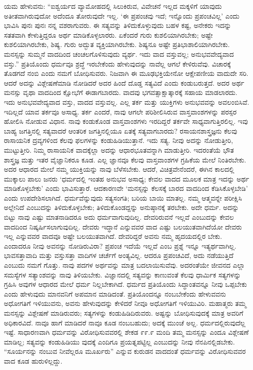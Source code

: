 ಯಮ ಹೇಳುವನು: “ಐಶ್ವರ್ಯದ ವ್ಯಾಮೋಹದಲ್ಲಿ ಸಿಲುಕಿರುವ, ವಿವೇಚನೆ ಇಲ್ಲದ ಮಕ್ಕಳಿಗೆ ಯಾವುದು ಅತೀತವಾಗಿರುವುದೋ ಅದೆಂದೂ ತೋರುವುದೇ ಇಲ್ಲ. ‘ಈ ಪ್ರಪಂಚವು ಇದೆ; ಇನ್ನೊಂದು ಪ್ರಪಂಚವಿಲ್ಲ’ ಎಂದು ಭಾವಿಸಿ ಪುನಃ ಪುನಃ ನನ್ನ ವಶರಾಗುವರು. ಈ ಸತ್ಯವನ್ನು ತಿಳಿದುಕೊಳ್ಳುವುದು ಬಹಳ ಕಷ್ಟ, ಅನೇಕರು ಇದನ್ನು ಸತತವಾಗಿ ಕೇಳುತ್ತಿದ್ದರೂ ಅರ್ಥ ಮಾಡಿಕೊಳ್ಳಲಾರರು. ಏಕೆಂದರೆ ಗುರು ಕುಶಲಿಯಾಗಿರಬೇಕು; ಅಷ್ಟೇ ಕುಶಲಿಯಾಗಿರಬೇಕು, ಶಿಷ್ಯ. ಗುರು ಅದ್ಭುತ ವ್ಯಕ್ತಿಯಾಗಿರಬೇಕು. ಶಿಷ್ಯನೂ ಅಷ್ಟೇ ಪ್ರತಿಭಾಶಾಲಿಯಾಗಿರಬೇಕು. ಮನಸ್ಸನ್ನು ಸುಮ್ಮನೆ ವಾದದಿಂದ ಚಂಚಲಗೊಳಿಸುವುದು ವ್ಯರ್ಥ. ಇದು ವಾದ ವಸ್ತುವಲ್ಲ; ಅನುಭವವೇದ್ಯವಾದ ವಸ್ತು.” ಪ್ರತಿಯೊಂದು ಧರ್ಮವೂ ಶ್ರದ್ಧೆ ಇರಬೇಕೆಂದು ಹೇಳುವುದನ್ನು ನಾವೆಲ್ಲ ಆಗಲೆ ಕೇಳಿರುವೆವು. ವಿಚಾರಕ್ಕೆ ತೊಡಗದೆ ನಂಬಿ ಎಂದು ನಮಗೆ ಬೋಧಿಸುವರು. ನಿಜವಾಗಿ ಈ ಮೂಢಭಕ್ತಿಯೇನೋ ಆಕ್ಷೇಪಣೀಯ ವಾದುದೇ ಸರಿ. ಆದರೆ ಅದನ್ನು ವಿಶ್ಲೇಷಣೆಮಾಡಿ ನೋಡಿದರೆ ಅದರ ಹಿಂದೆ ದೊಡ್ಡ ಸತ್ಯವಿದೆ ಎಂದು ಕಂಡುಬರುತ್ತದೆ. ಅದರ ಅರ್ಥ ಮನಸ್ಸು ವೃಥಾ ವಾದದಿಂದ ಕ್ಷೋಭೆಗೆ ಈಡಾಗಬಾರದು. ವಾದವು ಭಗವತ್ಸಾಕ್ಷಾತ್ಕಾರಕ್ಕೆ ಸಹಾಯ ಮಾಡಲಾರದು. ಇದು ಅನುಭವವೇದ್ಯವಾದ ವಸ್ತು, ವಾದದ ವಸ್ತುವಲ್ಲ. ಎಲ್ಲ ತರ್ಕ ಮತ್ತು ಯುಕ್ತಿಗಳು ಅನುಭವವನ್ನು ಅವಲಂಬಿಸಿವೆ. ಇದಿಲ್ಲದೆ ಯಾವ ತರ್ಕವೂ ಅಸಾಧ್ಯ. ತರ್ಕ ಎಂದರೆ, ನಾವು ಆಗಲೇ ಪರಿಶೀಲಿಸಿರುವ ವಾಸ್ತವಾಂಶಗಳನ್ನು ಪರಸ್ಪರ ಹೋಲಿಸಿ ನೋಡುವ ವಿಧಾನ. ನಾವು ಕಂಡುಕೊಂಡ ವಾಸ್ತವಾಂಶಗಳು ಇರದಿದ್ದರೆ ತರ್ಕವೇ ಸಾಧ್ಯವಾಗುತ್ತಿರಲಿಲ್ಲ. ಇವು ಬಾಹ್ಯ ಜಗತ್ತಿನಲ್ಲಿ ಸತ್ಯವಾದರೆ ಆಂತರಿಕ ಜಗತ್ತಿನಲ್ಲಿಯೂ ಏತಕ್ಕೆ ಸತ್ಯವಾಗಬಾರದು? ರಸಾಯನಶಾಸ್ತ್ರಜ್ಞನು ಕೆಲವು ರಾಸಾಯನಿಕ ದ್ರವ್ಯಗಳಿಂದ ಕೆಲವು ಫಲಗಳನ್ನು ಕಂಡುಹಿಡಿಯುತ್ತಾನೆ. ಇದು ಸತ್ಯ. ನೀವು ಅದನ್ನು ನೋಡುತ್ತೀರಿ, ಮುಟ್ಟುತ್ತೀರಿ. ನಿಮ್ಮ ರಾಸಾಯನಿಕ ವಾದಕ್ಕೆಲ್ಲಾ ಅದನ್ನು ಆಧಾರಭೂತವನ್ನಾಗಿ ಮಾಡುತ್ತೀರಿ. ಇದರಂತೆಯೆ ಭೌತ ಶಾಸ್ತ್ರಜ್ಞ ಮತ್ತು ಇತರ ವೈಜ್ಞಾನಿಕರೂ ಕೂಡ. ಎಲ್ಲ ಜ್ಞಾನವೂ ಕೆಲವು ವಾಸ್ತವಾಂಶಗಳ ಗ್ರಹಿಕೆಯ ಮೇಲೆ ನಿಂತಿರಬೇಕು. ಅದರ ಆಧಾರದ ಮೇಲೆ ನಮ್ಮ ಯುಕ್ತಿಯನ್ನು ನಾವು ಬೆಳೆಸಬೇಕು. ಆದರೆ, ವಿಚಿತ್ರವೇನೆಂದರೆ, ಈಗಿನ ಕಾಲದಲ್ಲಿ ಮುಕ್ಕಾಲು ಪಾಲು ಜನರು ‘ಧರ್ಮದಲ್ಲಿ ಇಂತಹ ಅನುಭವ ಅಸಾಧ್ಯ; ಕೇವಲ ವಾದದ ಮೂಲಕ ಮಾತ್ರ ಇದನ್ನು ಅರ್ಥ ಮಾಡಿಕೊಳ್ಳಬೇಕು’ ಎಂದು ಭಾವಿಸುತ್ತಾರೆ. ಆದಕಾರಣವೇ ‘ಮನಸ್ಸನ್ನು ಕೆಲಸಕ್ಕೆ ಬಾರದ ವಾದದಿಂದ ಕೆಡಿಸಿಕೊಳ್ಳಬೇಡಿ’ ಎಂದು ಉಪದೇಶಿಸಲಾಗಿದೆ. ಧರ್ಮವೆನ್ನುವುದು ಸತ್ಯಸಂಗತಿ; ಬರಿಯ ಬಾಯಿ ಮಾತಲ್ಲ. ನಮ್ಮ ಆತ್ಮವನ್ನೇ ಪರೀಕ್ಷಿಸಿ ಅಲ್ಲೇನಿದೆ ಎಂಬುದನ್ನು ತಿಳಿದುಕೊಳ್ಳಬೇಕು; ತಿಳಿದುಕೊಂಡದ್ದನ್ನು ಅನುಷ್ಠಾನಕ್ಕೆ ತರಬೇಕು. ಅದೇ ಧರ್ಮ. ಅದನ್ನು ಬಿಟ್ಟು ನಾವು ಎಷ್ಟು ಮಾತನಾಡಿದರೂ ಅದು ಧರ್ಮವಾಗುವುದಿಲ್ಲ. ದೇವರಿರುವನೆ ಇಲ್ಲವೆ ಎಂಬುದನ್ನು ಕೇವಲ ವಾದದಿಂದ ನಿಷ್ಕರ್ಷಿಸಲಾಗುವುದಿಲ್ಲ. ದೇವರು ಇದ್ಧಾನೆ ಎನ್ನುವವರ ವಾದ ಎಷ್ಟು ಬಲಯುತವಾಗಿದೆಯೋ ದೇವರು ಇಲ್ಲ ಎನ್ನುವವರ ವಾದವೂ ಅಷ್ಟೇ ಬಲಯುತವಾಗಿದೆ. ದೇವರಿದ್ದರೆ ಅವನು ನಮ್ಮ ಹೃದಯದಲ್ಲಿರ ಬೇಕು. ಎಂದಾದರೂ ನೀವು ಅವನನ್ನು ನೋಡಿರುವಿರಾ? ಪ್ರಪಂಚ ಇದೆಯೆ ಇಲ್ಲವೆ ಎಂಬ ಪ್ರಶ್ನೆ ಇನ್ನೂ ಇತ್ಯರ್ಥವಾಗಿಲ್ಲ. ಭಾವಸತ್ತಾವಾದಿ ಮತ್ತು ವಸ್ತುಸತ್ತಾ ವಾದಿಗಳ ಚರ್ಚೆಗೆ ಅಂತ್ಯವಿಲ್ಲ. ಆದರೂ ಪ್ರಪಂಚವಿದೆ, ಅದು ನಡೆಯುತ್ತಿದೆ ಎಂಬುದು ನಮಗೆ ಗೊತ್ತು. ನಾವು ಪದಗಳ ಅರ್ಥವನ್ನು ಮಾತ್ರ ಬದಲಾಯಿಸುವೆವು. ಅದರಂತೆಯೇ ಜೀವನದ ಎಲ್ಲಾ ಸಮಸ್ಯೆಗಳ ಸತ್ಯಾಂಶವನ್ನು ನಾವು ತಿಳಿಯಬೇಕು. ವಿಜ್ಞಾನದಲ್ಲಿ ಸತ್ಯವನ್ನು ಕಾಣುವಂತೆ ಕೆಲವು ಧಾರ್ಮಿಕ ಸತ್ಯಗಳನ್ನು ಗ್ರಹಿಸಿ ಅವುಗಳ ಆಧಾರದ ಮೇಲೆ ಧರ್ಮ ನಿಲ್ಲಬೇಕಾಗಿದೆ. ಧರ್ಮದ ಪ್ರತಿಯೊಂದು ಸಿದ್ಧಾಂತವನ್ನೂ ನೀವು ಒಪ್ಪಬೇಕು ಎಂದು ಹೇಳುವುದು ಮಾನವನಿಗೆ ಅಪಮಾನ ಮಾಡಿದಂತೆ. ಪ್ರತಿಯೊಂದನ್ನೂ ನಂಬಬೇಕೆಂದು ಹೇಳುವವನು ಅಧೋಗತಿಗೆ ಇಳಿಯುವನು, ಅವನು ಹೇಳುವುದನ್ನು ಕೇಳಿದರೆ ನೀವೂ ಅಧೋಗತಿಗೆ ಇಳಿಯುವಿರಿ. ಮಹಾತ್ಮರು ತಮ್ಮ ಮನಸ್ಸನ್ನು ವಿಶ್ಲೇಷಣೆ ಮಾಡಿರುವರು; ಸತ್ಯಗಳನ್ನು ಕಂಡುಹಿಡಿದಿರುವರು. ಅಷ್ಟನ್ನು ಬೋಧಿಸುವುದಕ್ಕೆ ಮಾತ್ರ ಅವರಿಗೆ ಅಧಿಕಾರವಿದೆ. ನಾವೂ ಹಾಗೆ ಮಾಡಿದರೆ ನಾವೂ ಕೂಡ ನಂಬಬಹುದು; ಅದಕ್ಕೆ ಮುಂಚೆ ಅಲ್ಲ. ಧರ್ಮದಲ್ಲಿರುವುದೆಲ್ಲ ಇಷ್ಟೆ. ಸಾಧಾರಣವಾಗಿ ಧರ್ಮವನ್ನು ವಿರೋಧಿಸುವವರಲ್ಲಿ ಶೇಕಡ ೯೯.೯ ಮಂದಿ ತಮ್ಮ ಮನಸ್ಸನ್ನು ಎಂದೂ ವಿಶ್ಲೇಷಣೆ ಮಾಡಿಲ್ಲ; ಸತ್ಯವನ್ನು ಕಂಡುಹಿಡಿಯು ವುದಕ್ಕೆ ಎಂದಿಗೂ ಪ್ರಯತ್ನಪಟ್ಟಿಲ್ಲ ಎಂಬುದನ್ನು ನೀವು ನೆನಪಿನಲ್ಲಿಡಬೇಕು. “ಸೂರ್ಯನನ್ನು ನಂಬುವ ನೀವೆಲ್ಲರೂ ಮೂರ್ಖರು” ಎನ್ನುವ ಕುರುಡನ ವಾದದಂತೆ ಧರ್ಮವನ್ನು ವಿರೋಧಿಸುವವರ ವಾದ ಕೂಡ ಹುರುಳಿಲ್ಲದ್ದು.


